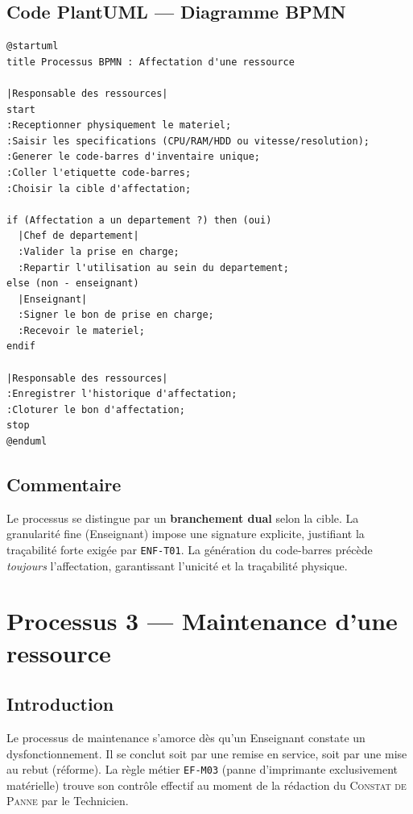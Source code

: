 \documentclass[a4paper,11pt,openany]{report}
\newcommand{\constat}{\textsc{Constat de Panne}}
\begin{document}
\subsection{Code PlantUML --- Diagramme BPMN}

\begin{lstlisting}[caption={Processus BPMN --- Affectation},
                   label={lst:bpmnAffectation}]
@startuml
title Processus BPMN : Affectation d'une ressource

|Responsable des ressources|
start
:Receptionner physiquement le materiel;
:Saisir les specifications (CPU/RAM/HDD ou vitesse/resolution);
:Generer le code-barres d'inventaire unique;
:Coller l'etiquette code-barres;
:Choisir la cible d'affectation;

if (Affectation a un departement ?) then (oui)
  |Chef de departement|
  :Valider la prise en charge;
  :Repartir l'utilisation au sein du departement;
else (non - enseignant)
  |Enseignant|
  :Signer le bon de prise en charge;
  :Recevoir le materiel;
endif

|Responsable des ressources|
:Enregistrer l'historique d'affectation;
:Cloturer le bon d'affectation;
stop
@enduml
\end{lstlisting}

\subsection{Commentaire}

Le processus se distingue par un \textbf{branchement dual} selon
la cible. La granularité fine (Enseignant) impose une signature
explicite, justifiant la traçabilité forte exigée par
\texttt{ENF-T01}. La génération du code-barres précède
\emph{toujours} l'affectation, garantissant l'unicité et la
traçabilité physique.

\section{Processus 3 --- Maintenance d'une ressource}

\subsection{Introduction}

Le processus de maintenance s'amorce dès qu'un Enseignant
constate un dysfonctionnement. Il se conclut soit par une remise
en service, soit par une mise au rebut (réforme). La règle
métier \texttt{EF-M03} (panne d'imprimante exclusivement
matérielle) trouve son contrôle effectif au moment de la
rédaction du \constat{} par le Technicien.
\end{document}

